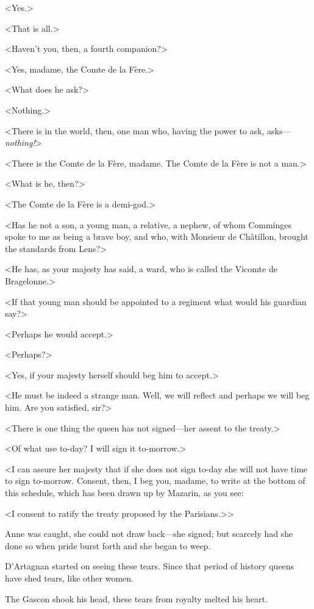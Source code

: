 <Yes.>

<That is all.>

<Haven't you, then, a fourth companion?>

<Yes, madame, the Comte de la Fère.>

<What does he ask?>

<Nothing.>

<There is in the world, then, one man who, having the power to ask, asks—\textit{nothing!}>

<There is the Comte de la Fère, madame. The Comte de la Fère is not a man.>

<What is he, then?>

<The Comte de la Fère is a demi-god.>

<Has he not a son, a young man, a relative, a nephew, of whom Comminges spoke to me as being a brave boy, and who, with Monsieur de Châtillon, brought the standards from Lens?>

<He has, as your majesty has said, a ward, who is called the Vicomte de Bragelonne.>

<If that young man should be appointed to a regiment what would his guardian say?>

<Perhaps he would accept.>

<Perhaps?>

<Yes, if your majesty herself should beg him to accept.>

<He must be indeed a strange man. Well, we will reflect and perhaps we will beg him. Are you satisfied, sir?>

<There is one thing the queen has not signed—her assent to the treaty.>

<Of what use to-day? I will sign it to-morrow.>

<I can assure her majesty that if she does not sign to-day she will not have time to sign to-morrow. Consent, then, I beg you, madame, to write at the bottom of this schedule, which has been drawn up by Mazarin, as you see:

<I consent to ratify the treaty proposed by the Parisians.>>

Anne was caught, she could not draw back—she signed; but scarcely had she done so when pride burst forth and she began to weep.

D'Artagnan started on seeing these tears. Since that period of history queens have shed tears, like other women.

The Gascon shook his head, these tears from royalty melted his heart.

